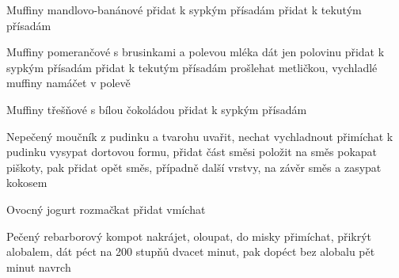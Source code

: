 \documentclass[12pt,a4paper]{article}
\begin{document}
\begin{recipe}{Muffiny mandlovo-banánové}
   přidat k sypkým přísadám
   přidat k tekutým přísadám
\end{recipe}
\newpage

\begin{recipe}{Muffiny pomerančové s brusinkami a polevou}
   mléka dát jen polovinu
   přidat k sypkým přísadám
   přidat k tekutým přísadám
   prošlehat metličkou, vychladlé muffiny namáčet v polevě
\end{recipe}
\newpage

\begin{recipe}{Muffiny třešňové s bílou čokoládou}
   přidat k sypkým přísadám
\end{recipe}
\newpage

\begin{recipe}{Nepečený moučník z pudinku a tvarohu}
   uvařit, nechat vychladnout
   přimíchat k pudinku
   vysypat dortovou formu, přidat část směsi
   položit na směs
   pokapat piškoty, pak přidat opět směs, případně další vrstvy, na závěr směs a zasypat kokosem
\end{recipe}
\newpage

\begin{recipe}{Ovocný jogurt}
   rozmačkat
   přidat
   vmíchat
\end{recipe}
\newpage

\begin{recipe}{Pečený rebarborový kompot}
   nakrájet, oloupat, do misky
   přimíchat, přikrýt alobalem, dát péct na 200 stup\-ňů dvacet minut, pak dopéct bez alobalu pět minut
   navrch
\end{recipe}
\newpage
\end{document}
